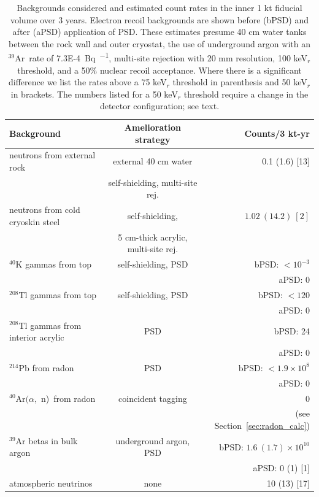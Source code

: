 \documentclass[a4paper,11pt]{article}
\newcommand{\artn}{$^{39}$Ar}
\newcommand{\alphan}{$(\alpha,$ n)}
\begin{document}
\begin{table}[ht]
\begin{tabular}{ l  c r}
Background  & Amelioration strategy & Counts/3 kt-yr \\
\hline
  neutrons  from external rock & external 40 cm water & 0.1 (1.6) [13] \\
  & self-shielding, multi-site rej. &\\[8pt]
 neutrons from cold cryoskin steel  & self-shielding, & $1.02~(14.2)~[2]$\\ &5 cm-thick acrylic, multi-site rej. &  \\[8pt]
  $^{40}$K gammas from top & self-shielding, PSD & bPSD: $< 10^{-3}$\\
  & & aPSD: 0 \\[8pt]
$^{208}$Tl gammas from top & self-shielding, PSD & bPSD: $< 120$\\
& & aPSD: 0 \\[8pt]
$^{208}$Tl gammas from interior acrylic & PSD & bPSD: 24\\
& & aPSD: 0 \\[8pt]
$^{214}$Pb from radon & PSD & bPSD: $< 1.9\times10^8$\\
& & aPSD: 0\\[8pt]
$^{40}$Ar\alphan~from radon & coincident tagging & 0 \\
& & (see Section~\ref{sec:radon_calc})\\[8pt]
$^{39}$Ar betas in bulk argon & underground argon, PSD & bPSD: $1.6~(1.7) \times10^{10}$\\
& & aPSD: 0 (1) [1] \\[8pt]
atmospheric neutrinos & none & 10 (13) [17]\\
\hline
\end{tabular}
\label{table:DUNE}
\caption{Backgrounds considered and estimated count rates in the inner 1 kt fiducial volume over 3 years. Electron recoil backgrounds are shown before (bPSD) and after (aPSD) application of PSD. These estimates presume 40 cm water tanks between the rock wall and outer cryostat, the use of underground argon with an \artn~rate of \SI{7.3E-4}{\becquerel\per\kgar}, multi-site rejection with 20 mm resolution, 100 keV$_r$ threshold, and a 50\% nuclear recoil acceptance. Where there is a significant difference we list the rates above a 75 keV$_r$ threshold in parenthesis and 50 keV$_r$ in brackets. The numbers listed for a 50 keV$_r$ threshold require a change in the detector configuration; see text.}
\end{table}
\end{document}
